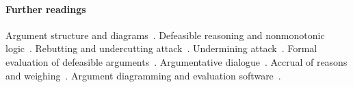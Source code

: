 \documentclass[10pt]{article}
\begin{document}
%
%
%
%
%
%

\paragraph{Further readings} 
Argument structure and diagrams~\citep{wigmore1913,toulmin1958,freeman1991}. Defeasible reasoning and nonmonotonic logic~\citep{pollock1987,gabbayEtal1994}. Rebutting and undercutting attack~\citep{pollock1987,pollock1995}. Undermining attack~\citep{bondarenkoEtal1997}. Formal evaluation of defeasible arguments~\citep{pollock1987,pollock1995,dung1995,prakken2010}. Argumentative dialogue~\citep{toulmin1958,waltonKrabbe1995,prakken1997,hage2000}. Accrual of reasons and weighing~\citep{pollock1995,hage1997,verheij1996diss,prakken2005}. Argument diagramming and evaluation software~\citep{pollock1995,reedRowe2004,kirschnerEtal2003,vanGelder2003,verheij2005,gordonEtal2007}.
\end{document}
